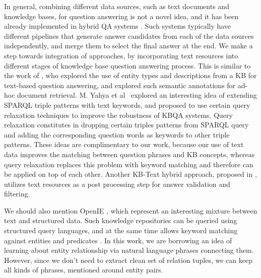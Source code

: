 In general, combining different data sources, such as text documents and knowledge bases, for question answering is not a novel idea, and it has been already implemented in hybrid QA systems \cite{baudivs2015modeling,Barker12}.
Such systems typically have different pipelines that generate answer candidates from each of the data sources independently, and merge them to select the final answer at the end.
We make a step towards integration of approaches, by incorporating text resources into different stages of knowledge base question answering process.
This is similar to the work of \cite{Sun:2015:ODQ:2736277.2741651}, who explored the use of entity types and descriptions from a KB for text-based question answering, and \cite{dalton2014entity} explored such semantic annotations for ad-hoc document retrieval.
M. Yahya et al~\cite{yahya2013robust} explored an interesting idea of extending SPARQL triple patterns with text keywords, and proposed to use certain query relaxation techniques to improve the robustness of KBQA systems.
Query relaxation constitutes in dropping certain triples patterns from SPARQL query and adding the corresponding question words as keywords to other triple patterns.
These ideas are complimentary to our work, because our use of text data improves the matching between question phrases and KB concepts, whereas query relaxation replaces this problem with keyword matching and therefore can be applied on top of each other.
Another KB-Text hybrid approach, proposed in \cite{xu2016enhancing}, utilizes text resources as a post processing step for answer validation and filtering.

We should also mention OpenIE \cite{fader2011identifying}, which represent an interesting mixture between text and structured data.
Such knowledge repositories can be queried using structured query languages, and at the same time allows keyword matching against entities and predicates \cite{Fader:2014:OQA:2623330.2623677}.
In this work, we are borrowing an idea of learning about entity relationship via natural language phrases connecting them.
However, since we don't need to extract clean set of relation tuples, we can keep all kinds of phrases, mentioned around entity pairs.

